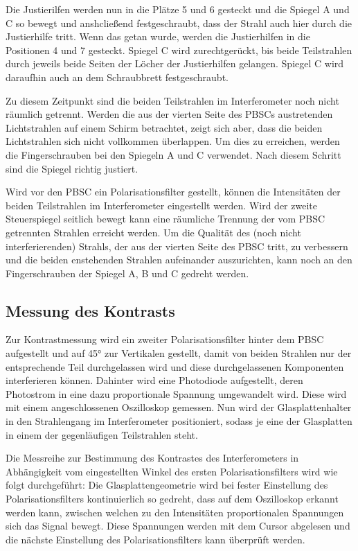Die Justierilfen werden nun in die Plätze 5 und 6 gesteckt und die Spiegel A und C so bewegt und anshcließend festgeschraubt, dass der Strahl auch hier durch die Justierhilfe tritt. Wenn das getan wurde, werden die Justierhilfen in die Positionen 4 und 7 gesteckt. Spiegel C wird zurechtgerückt, bis beide Teilstrahlen durch jeweils beide Seiten der Löcher der Justierhilfen gelangen. Spiegel C wird daraufhin auch an dem Schraubbrett festgeschraubt.

Zu diesem Zeitpunkt sind die beiden Teilstrahlen im Interferometer noch nicht räumlich getrennt. Werden die aus der vierten Seite des PBSCs austretenden Lichtstrahlen auf einem Schirm betrachtet, zeigt
sich aber, dass die beiden Lichtstrahlen sich nicht vollkommen überlappen. Um dies zu erreichen, werden die Fingerschrauben bei den Spiegeln A und C verwendet. Nach diesem Schritt sind die Spiegel
richtig justiert.

Wird vor den PBSC ein Polarisationsfilter gestellt, können die Intensitäten der beiden Teilstrahlen im Interferometer eingestellt werden. Wird der zweite Steuerspiegel seitlich bewegt kann eine räumliche Trennung der vom PBSC getrennten Strahlen erreicht werden. Um die Qualität des (noch nicht interferierenden) Strahls, der aus der vierten Seite des PBSC tritt, zu verbessern und die beiden enstehenden Strahlen aufeinander auszurichten, kann noch an den Fingerschrauben der Spiegel A, B und C gedreht werden.

\subsection{Messung des Kontrasts}
Zur Kontrastmessung wird ein zweiter Polarisationsfilter hinter dem PBSC aufgestellt und auf 45° zur Vertikalen gestellt, damit von beiden Strahlen nur der entsprechende Teil durchgelassen wird und diese durchgelassenen Komponenten interferieren können. Dahinter wird eine Photodiode aufgestellt, deren Photostrom in eine dazu proportionale Spannung umgewandelt wird. Diese wird mit einem angeschlossenen Oszilloskop gemessen. Nun wird der Glasplattenhalter in den Strahlengang im Interferometer positioniert, sodass je eine der Glasplatten in einem der gegenläufigen Teilstrahlen steht.

Die Messreihe zur Bestimmung des Kontrastes des Interferometers in Abhängigkeit vom eingestellten Winkel des ersten Polarisationsfilters wird wie folgt durchgeführt: Die Glasplattengeometrie wird bei fester Einstellung des Polarisationsfilters kontinuierlich so gedreht, dass auf dem Oszilloskop erkannt werden kann, zwischen welchen zu den Intensitäten proportionalen Spannungen sich das Signal bewegt. Diese Spannungen werden mit dem Cursor abgelesen und die nächste Einstellung des Polarisationsfilters kann überprüft werden.

